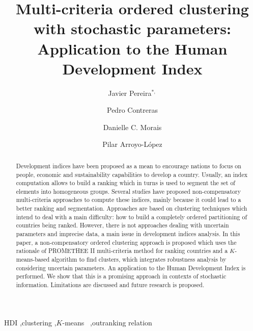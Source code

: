 \documentclass[]{elsarticle}
\theoremstyle{definition}
\begin{document}
\begin{frontmatter}                           %


\title{Multi-criteria ordered clustering with stochastic parameters: Application to the Human Development Index}


\author[utc]{Javier Pereira$^{*,}$\cortext[cor1]}
\author[ap]{Pedro Contreras}
\author[ufpe]{Danielle C. Morais}
\author[itesm]{Pilar Arroyo-L\'opez}




\address[utc]{Universidad Tecnol\'ogica de Chile Inacap, Santiago, Chile (xjavierpereira7@gmail.com); \\}
\address[ap]{WMG, The University of Warwick, UK (pedro.contreras@gmail.com);}
\address[ufpe]{Universidade Federal de Pernambuco, CDSID (dcmorais@cdsid.org.br);}
\address[itesm]{Tecnologico de Monterrey, Campus Toluca, M\'exico (pilar.arroyo@itesm.mx);}



\begin{abstract}
Development indices have been proposed as a mean to encourage nations to focus on people, economic and sustainability  capabilities to develop a country.  Usually, an index computation allows to build a ranking which in turns is used to segment the set of  elements into homogeneous groups.   Several studies have proposed non-compensatory multi-criteria approaches to compute these indices, mainly because it could lead to a better ranking and segmentation. Approaches are based on clustering techniques which intend to deal with a main difficulty: how to build a completely ordered partitioning of countries being ranked.  However, there is not approaches dealing with uncertain parameters and imprecise data, a main issue in development indices analysis.  In this paper, a non-compensatory ordered clustering approach is proposed which uses the rationale of PROMETHEE II multi-criteria method for ranking countries and a $K$-means-based algorithm to find clusters, which integrates robustness analysis by considering uncertain parameters.  An application to the Human Development Index is performed. We show that this is a promising approach in contexts of stochastic information. Limitations are discussed and future research is proposed.
\end{abstract}

\begin{keyword}
HDI \sep clustering \sep $K$-means \ \sep outranking relation 
\end{keyword}

\end{frontmatter}
\end{document}
